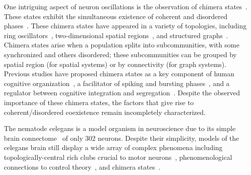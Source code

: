 \documentclass[10pt,letterpaper]{article}
\begin{document}
One intriguing aspect of neuron oscillations
is the observation of chimera states~\cite{majhi2019chimera}.
These states exhibit the simultaneous existence
of coherent and disordered phases~\cite{abrams2004chimera}.
These chimera states have appeared in a variety of topologies,
including ring oscillators~\cite{abrams2004chimera},
two-dimensional spatial regions~\cite{shima2004rotating},
and structured graphs~\cite{shanahan2010metastable}.
Chimera states arise when a population splits into subcommunities,
with some synchronized and others disordered;
these subcommunities can be grouped by spatial region (for spatial systems)
or by connectivity (for graph systems).
Previous studies have proposed
chimera states as
a key component of human cognitive organization~\cite{bansal2019cognitive},
a facilitator of spiking and bursting phases~\cite{santos2017chimeralike},
and a regulator between cognitive integration and segregation~\cite{patton2025changing}.
Despite the observed importance of these chimera states,
the factors that give rise to coherent/disordered coexistence
remain incompletely characterized.

The nematode \gls{celegans}
is a model organism in neuroscience due to
its simple brain connectome~\cite{cook2019whole}
of only \num{302} neurons.
Despite their simplicity, models of the \gls{celegans} brain
still display a wide array of complex phenomena including
topologically-central rich clubs
crucial to motor neurons~\cite{towlson2013rich},
phenomenological connections to control theory~\cite{yan2017network},
and chimera states~\cite{hizanidis2016chimera}.
\end{document}
